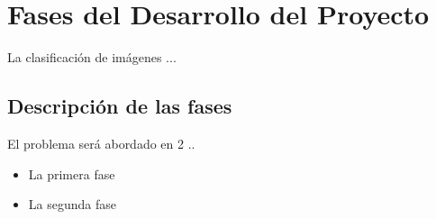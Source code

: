 \chapter{Fases del Desarrollo del Proyecto}
\label{cht-enfoque}
La clasificación de imágenes ...

\section{Descripción de las fases}

El problema será abordado en 2 ..

\begin{itemize}
\item La primera fase 
\item La segunda fase 
\end{itemize}





